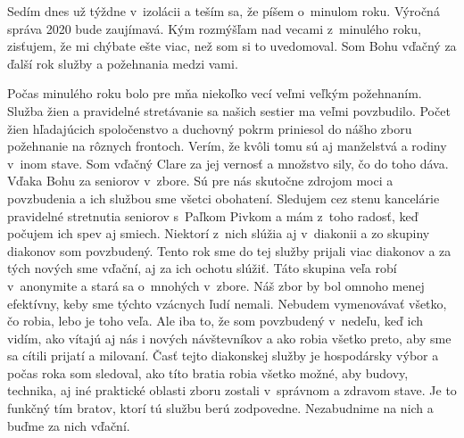 

Sedím dnes už týždne v~izolácii a teším sa, že píšem o~minulom roku. Výročná správa 2020 bude zaujímavá. Kým rozmýšľam nad vecami z~minulého roku, zisťujem, že mi chýbate ešte viac, než som si to uvedomoval. Som Bohu vďačný za ďalší rok služby a požehnania medzi vami.

Počas minulého roku bolo pre mňa niekoľko vecí veľmi veľkým požehnaním. {\bi Služba žien} a pravidelné stretávanie sa našich sestier ma veľmi povzbudilo. Počet žien hľadajúcich spoločenstvo a duchovný pokrm priniesol do nášho zboru požehnanie na rôznych frontoch. Verím, že kvôli tomu sú aj manželstvá a rodiny v~inom stave. Som vďačný Clare za jej vernosť a množstvo sily, čo do toho dáva.  Vďaka Bohu za {\bi seniorov} v~zbore. Sú pre nás skutočne zdrojom moci a povzbudenia a ich službou sme všetci obohatení. Sledujem cez stenu kancelárie pravidelné stretnutia seniorov s~Paľkom Pivkom a mám z~toho radosť, keď počujem ich spev aj smiech. Niektorí z~nich slúžia aj v~{\bi diakonii} a zo skupiny diakonov som povzbudený. Tento rok sme do tej služby prijali viac diakonov a za tých nových sme vďační, aj za ich ochotu slúžiť. Táto skupina veľa robí v~anonymite a stará sa o~mnohých v~zbore. Náš zbor by bol omnoho menej efektívny, keby sme týchto vzácnych ľudí nemali. Nebudem  vymenovávať všetko, čo robia, lebo je toho veľa. Ale iba to, že som povzbudený v~nedeľu, keď ich vidím, ako vítajú aj nás i nových návštevníkov a ako robia všetko preto, aby sme sa cítili prijatí a milovaní. Časť tejto diakonskej služby je {\bi hospodársky výbor} a počas roka som sledoval, ako títo bratia robia všetko možné, aby budovy, technika, aj iné praktické oblasti zboru zostali v~správnom a zdravom stave. Je to funkčný tím bratov, ktorí tú službu berú zodpovedne. Nezabudnime na nich a buďme za nich vďační.


